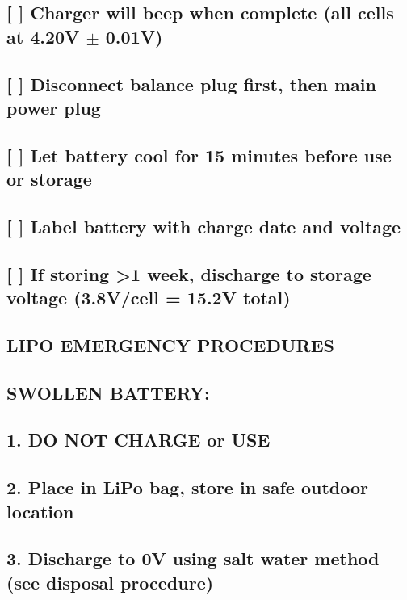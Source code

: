 \documentclass[11pt,letterpaper]{article}
\begin{document}
\subsection*{[ ] Charger will beep when complete (all cells at 4.20V $\pm$ 0.01V)}

\subsection*{[ ] Disconnect balance plug first, then main power plug}

\subsection*{[ ] Let battery cool for 15 minutes before use or storage}

\subsection*{[ ] Label battery with charge date and voltage}

\subsection*{[ ] If storing >1 week, discharge to storage voltage (3.8V/cell = 15.2V total)}

\subsection*{LIPO EMERGENCY PROCEDURES}

\subsection*{SWOLLEN BATTERY:}

\subsection*{1. DO NOT CHARGE or USE}

\subsection*{2. Place in LiPo bag, store in safe outdoor location}

\subsection*{3. Discharge to 0V using salt water method (see disposal procedure)}
\end{document}

